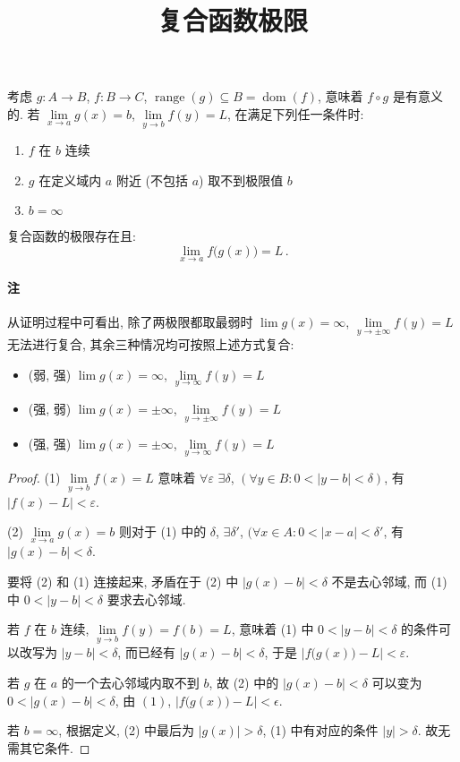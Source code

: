 \documentclass[UTF8]{ctexart}
\title{复合函数极限}
\begin{document}
\maketitle

考虑 $ g \colon A \to B $, $ f \colon B \to C $, $ \operatorname{range}(g) \subseteq B = \operatorname{dom}(f) $, 意味着 $ f \circ g $ 是有意义的. 若 $ \lim\limits_{x \to a} g(x) = b $, $ \lim\limits_{y \to b} f(y) = L $, 在满足下列任一条件时:
\begin{enumerate}
	\item $ f $ 在 $ b $ 连续
	\item $ g $ 在定义域内 $ a $ 附近 (不包括 $ a $) 取不到极限值 $ b $
	\item $ b = \infty $
\end{enumerate}

复合函数的极限存在且:
\[
	\lim_{x \to a} f \big( g(x) \big) = L \,.
\]

\paragraph{注}
从证明过程中可看出, 除了两极限都取最弱时 $ \lim g(x) = \infty $, $ \lim\limits_{y \to \pm \infty} f(y) = L $ 无法进行复合, 其余三种情况均可按照上述方式复合: 
\begin{itemize}
	\item (弱, 强) $ \lim g(x) = \infty $, $ \lim\limits_{y \to \infty} f(y) = L $
	\item (强, 弱) $ \lim g(x) = \pm \infty $, $ \lim\limits_{y \to \pm \infty} f(y) = L $
	\item (强, 强) $ \lim g(x) = \pm \infty $, $ \lim\limits_{y \to \infty} f(y) = L $
\end{itemize}

\begin{proof}
	(1) $ \lim\limits_{y \to b} f(x) = L $ 意味着 $ \forall \varepsilon $ $ \exists \delta $, $ (\forall y \in B \colon 0 < |y - b| < \delta) $, 有 $ |f(x) - L| < \varepsilon $.

	(2) $ \lim\limits_{x \to a} g(x) = b $ 则对于 (1) 中的 $ \delta $, $ \exists \delta' $, $ ( \forall x \in A \colon 0 < |x - a| < \delta' $, 有 $ |g(x) - b| < \delta $.

	要将 (2) 和 (1) 连接起来, 矛盾在于 (2) 中 $ |g(x) - b| < \delta $ 不是去心邻域, 而 (1) 中 $ 0 < |y - b| < \delta $ 要求去心邻域.

	若 $ f $ 在 $ b $ 连续, $ \lim\limits_{y \to b} f(y) = f(b) = L $, 意味着 (1) 中 $ 0 < |y - b| < \delta $ 的条件可以改写为 $ |y - b| < \delta $, 而已经有 $ |g(x) - b| < \delta $, 于是 $ |f \big( g(x) \big) - L| < \varepsilon $.

	若 $ g $ 在 $ a $ 的一个去心邻域内取不到 $ b $, 故 (2) 中的 $ |g(x) - b| < \delta $ 可以变为 $ 0 < |g(x) - b| < \delta $, 由 $ (1) $, $ |f \big( g(x) \big) - L| < \epsilon $.

	若 $ b = \infty $, 根据定义, (2) 中最后为 $ |g(x)| > \delta $, (1) 中有对应的条件 $ |y| > \delta $. 故无需其它条件.
\end{proof}
\end{document}

